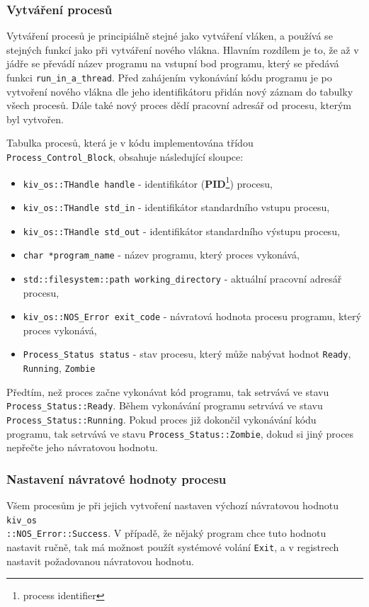 \documentclass[12pt, a4paper]{article}
\begin{document}
\subsubsection{Vytváření procesů}
Vytváření procesů je principiálně stejné jako vytváření vláken, a používá se stejných funkcí jako při vytváření nového vlákna. Hlavním rozdílem je to, že až v jádře se převádí název programu na vstupní bod programu, který se předává funkci \texttt{run\_in\_a\_thread}. Před zahájením vykonávání kódu programu je po vytvoření nového vlákna dle jeho identifikátoru přidán nový záznam do tabulky všech procesů. Dále také nový proces dědí pracovní adresář od procesu, kterým byl vytvořen.

Tabulka procesů, která je v kódu implementována třídou \texttt{Process\_Control\_Block}, obsahuje následující sloupce:
\begin{itemize}
    \item \texttt{kiv\_os::THandle handle} - identifikátor (\textbf{PID}\footnote{process identifier}) procesu,
    \item \texttt{kiv\_os::THandle std\_in} - identifikátor standardního vstupu procesu,
    \item \texttt{kiv\_os::THandle std\_out} - identifikátor standardního výstupu procesu,
    \item \texttt{char *program\_name} - název programu, který proces vykonává,
    \item \texttt{std::filesystem::path working\_directory} - aktuální pracovní adresář procesu,
    \item \texttt{kiv\_os::NOS\_Error exit\_code} - návratová hodnota procesu programu, který proces vykonává,
    \item \texttt{Process\_Status status} - stav procesu, který může nabývat hodnot \texttt{Ready}, \texttt{Running}, \texttt{Zombie}
\end{itemize}

Předtím, než proces začne vykonávat kód programu, tak setrvává ve stavu \texttt{Process\_Status::Ready}. Během vykonávání programu setrvává ve stavu \texttt{Process\_Status::Running}. Pokud proces již dokončil vykonávání kódu programu, tak setrvává ve stavu \texttt{Process\_Status::Zombie}, dokud si jiný proces nepřečte jeho návratovou hodnotu. 

\subsubsection{Nastavení návratové hodnoty procesu}
Všem procesům je při jejich vytvoření nastaven výchozí návratovou hodnotu \texttt{kiv\_os\\::NOS\_Error::Success}. V případě, že nějaký program chce tuto hodnotu nastavit ručně, tak má možnost použít systémové volání \texttt{Exit}, a v registrech nastavit požadovanou návratovou hodnotu.
\end{document}
